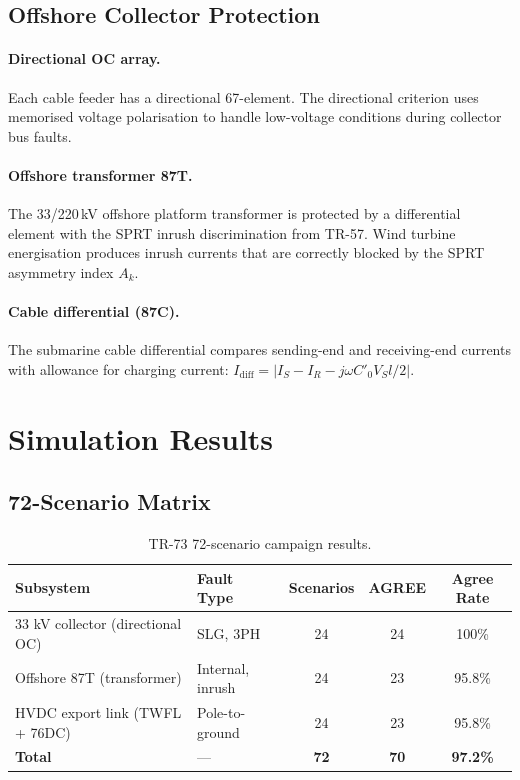 \documentclass[11pt, a4paper]{article}
\begin{document}
\subsection{Offshore Collector Protection}

\paragraph{Directional OC array.}
Each cable feeder has a directional 67-element. The directional criterion uses
memorised voltage polarisation to handle low-voltage conditions during
collector bus faults.

\paragraph{Offshore transformer 87T.}
The 33/220\,kV offshore platform transformer is protected by a differential
element with the SPRT inrush discrimination from TR-57.
Wind turbine energisation produces inrush currents that are correctly
blocked by the SPRT asymmetry index $A_k$.

\paragraph{Cable differential (87C).}
The submarine cable differential compares sending-end and receiving-end
currents with allowance for charging current:
$I_{\mathrm{diff}} = |I_S - I_R - j\omega C'_0 V_S l / 2|$.

\section{Simulation Results}
\label{sec:results}

\subsection{72-Scenario Matrix}

\begin{table}[ht]
\centering
\caption{TR-73 72-scenario campaign results.}
\label{tab:scenarios}
\begin{tabular}{llccc}
\toprule
Subsystem & Fault Type & Scenarios & AGREE & Agree Rate \\
\midrule
33 kV collector (directional OC) & SLG, 3PH & 24 & 24 & 100\% \\
Offshore 87T (transformer)       & Internal, inrush & 24 & 23 & 95.8\% \\
HVDC export link (TWFL + 76DC)   & Pole-to-ground & 24 & 23 & 95.8\% \\
\midrule
\textbf{Total} & --- & \textbf{72} & \textbf{70} & \textbf{97.2\%} \\
\bottomrule
\end{tabular}
\end{table}
\end{document}
